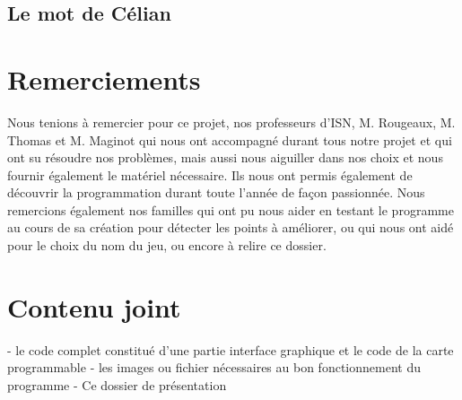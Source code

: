\documentclass[a4paper, 11pt]{article}
\begin{document}
\subsection*{Le mot de Célian}

\section*{Remerciements}

Nous tenions à remercier pour ce projet, nos professeurs d'ISN, M. Rougeaux, M. Thomas et M. Maginot qui nous ont accompagné durant tous notre projet et qui ont su résoudre nos problèmes, mais aussi nous aiguiller dans nos choix et nous fournir également le matériel nécessaire. Ils nous ont permis également de découvrir la programmation durant toute l'année de façon passionnée.
Nous remercions également nos familles qui ont pu nous aider en testant le programme au cours de sa création pour détecter les points à améliorer, ou qui nous ont aidé pour le choix du nom du jeu, ou encore à relire ce dossier.

\section*{Contenu joint}

- le code complet constitué d'une partie interface graphique et le code de la carte programmable
- les images ou fichier nécessaires au bon fonctionnement du programme
- Ce dossier de présentation
\end{document}
